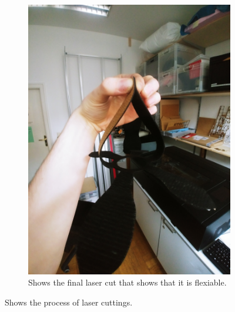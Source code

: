 \documentclass[04.3_buildingProcess.tex]{subfiles}
\begin{document}
\begin{flushleft}
\begin{figure}[H]
\begin{subfigure}{.45\textwidth}
                \centering
                \includegraphics[width=0.6\linewidth, angle=270]{images/materialProcess/08_LaserCut.jpg}
                \caption{Shows the final laser cut that shows that it is flexiable.}
                \label{fig:08_LaserCut}
                \vspace{6mm}
            \end{subfigure}
            \caption{Shows the process of laser cuttings.}
            \label{fig:laserCutTests}
        \end{figure}
    \end{flushleft}
\end{document}
